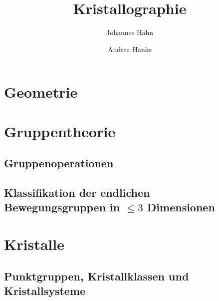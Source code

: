 \documentclass[fontsize=11pt,fleqn,a4paper]{scrartcl}
\title{Kristallographie}
\author{Johannes Hahn \and Andrea Hanke}
\begin{document}
\maketitle

\section{Geometrie}


%

\section{Gruppentheorie}

\subsection{Gruppenoperationen}

\subsection{Klassifikation der endlichen Bewegungsgruppen in $\leq 3$ Dimensionen}


%

\pagebreak
\section{Kristalle}

\subsection{Punktgruppen, Kristallklassen und Kristallsysteme}


%
\end{document}
